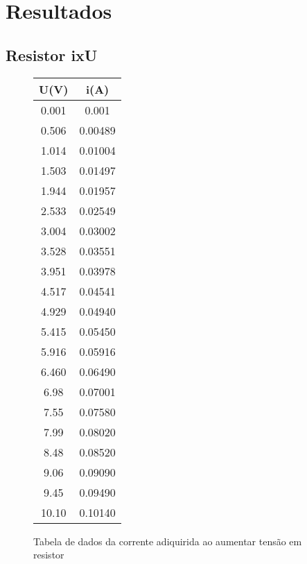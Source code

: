 \section{Resultados}
    \subsection{Resistor ixU}
        \begin{figure} [H] 
            \centering
            \begin{tabular}{||c | c||}
                \hline
                U(V)    &   i(A)    \\
                \hline
                0.001   &   0.001   \\
                0.506   &   0.00489 \\
                1.014   &   0.01004 \\
                1.503   &   0.01497 \\
                1.944   &   0.01957 \\
                2.533   &   0.02549 \\
                3.004   &   0.03002 \\
                3.528   &   0.03551 \\
                3.951   &   0.03978 \\
                4.517   &   0.04541 \\
                4.929   &   0.04940 \\
                5.415   &   0.05450 \\
                5.916   &   0.05916 \\
                6.460   &   0.06490 \\
                6.98    &   0.07001 \\
                7.55    &   0.07580 \\
                7.99    &   0.08020 \\
                8.48    &   0.08520 \\
                9.06    &   0.09090 \\
                9.45    &   0.09490 \\
                10.10   &   0.10140 \\
                \hline
            \end{tabular}
            \caption{Tabela de dados da corrente adiquirida ao aumentar tensão em resistor}
            \label{fig:tableR}
        \end{figure}

